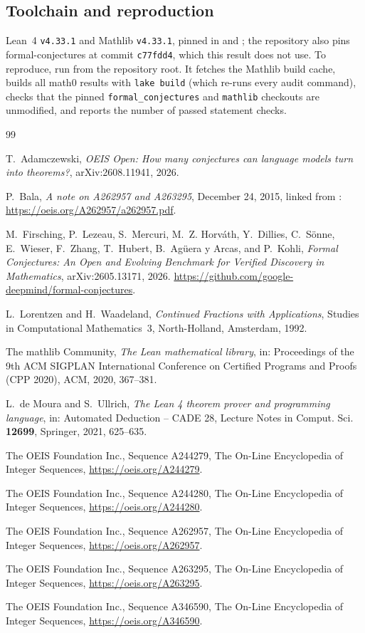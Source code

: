 \documentclass[11pt]{amsart}
\theoremstyle{plain}
\theoremstyle{definition}
\begin{document}
\subsection*{Toolchain and reproduction}
Lean~4 \cite{Lean4} \texttt{v4.33.1} and Mathlib \cite{Mathlib} \texttt{v4.33.1}, pinned in  and ; the repository also pins formal-conjectures \cite{FC} at commit \texttt{c77fdd4}, which this result does not use.
To reproduce, run  from the repository root. It fetches the Mathlib build cache, builds all math0 results with \texttt{lake build} (which re-runs every audit command), checks that the pinned \texttt{formal\_conjectures} and \texttt{mathlib} checkouts are unmodified, and reports the number of passed statement checks.

{\small
\begin{thebibliography}{99}

T.~Adamczewski, \emph{OEIS Open: How many conjectures can language models turn into theorems?}, arXiv:2608.11941, 2026.

P.~Bala, \emph{A note on A262957 and A263295}, December 24, 2015, linked from \cite{A262957}: \url{https://oeis.org/A262957/a262957.pdf}.

M.~Firsching, P.~Lezeau, S.~Mercuri, M.~Z. Horv\'ath, Y.~Dillies, C.~S\"onne, E.~Wieser, F.~Zhang, T.~Hubert, B.~Ag\"uera y Arcas, and P.~Kohli, \emph{Formal Conjectures: An Open and Evolving Benchmark for Verified Discovery in Mathematics}, arXiv:2605.13171, 2026. \url{https://github.com/google-deepmind/formal-conjectures}.

L.~Lorentzen and H.~Waadeland, \emph{Continued Fractions with Applications}, Studies in Computational Mathematics~3, North-Holland, Amsterdam, 1992.

The mathlib Community, \emph{The Lean mathematical library}, in: Proceedings of the 9th ACM SIGPLAN International Conference on Certified Programs and Proofs (CPP 2020), ACM, 2020, 367--381.

L.~de Moura and S.~Ullrich, \emph{The Lean 4 theorem prover and programming language}, in: Automated Deduction -- CADE 28, Lecture Notes in Comput. Sci. \textbf{12699}, Springer, 2021, 625--635.

The OEIS Foundation Inc., Sequence A244279, The On-Line Encyclopedia of Integer Sequences, \url{https://oeis.org/A244279}.

The OEIS Foundation Inc., Sequence A244280, The On-Line Encyclopedia of Integer Sequences, \url{https://oeis.org/A244280}.

The OEIS Foundation Inc., Sequence A262957, The On-Line Encyclopedia of Integer Sequences, \url{https://oeis.org/A262957}.

The OEIS Foundation Inc., Sequence A263295, The On-Line Encyclopedia of Integer Sequences, \url{https://oeis.org/A263295}.

The OEIS Foundation Inc., Sequence A346590, The On-Line Encyclopedia of Integer Sequences, \url{https://oeis.org/A346590}.

\end{thebibliography}
}
\end{document}
